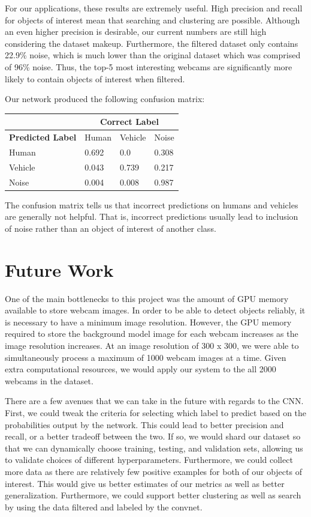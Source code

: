 \documentclass[10pt]{article} %
\begin{document}
For our applications, these results are extremely useful. High precision and
recall for objects of interest mean that searching and clustering are possible.
Although an even higher precision is desirable, our current numbers are still
high considering the dataset makeup. Furthermore, the filtered dataset only
contains 22.9\% noise, which is much lower than the original dataset which was
comprised of 96\% noise. Thus, the top-5 most interesting webcams are
significantly more likely to contain objects of interest when filtered.

Our network produced the following confusion matrix:
\begin{center}
  \begin{tabular}{ | m{8em} | m{5em}| m{5em} | m{5em} | }
    \hline
    & \multicolumn{3}{c|}{\textbf{Correct Label}} \\ 
    \hline
    \textbf{Predicted Label} & Human & Vehicle & Noise \\
    \hline
    Human & 0.692 & 0.0 & 0.308 \\
    \hline
    Vehicle & 0.043 & 0.739 & 0.217 \\
    \hline
    Noise & 0.004 & 0.008 & 0.987 \\
    \hline
  \end{tabular}
\end{center}
The confusion matrix tells us that incorrect predictions on humans and vehicles
are generally not helpful. That is, incorrect predictions usually lead to
inclusion of noise rather than an object of interest of another class.


\section{Future Work}
One of the main bottlenecks to this project was the amount of GPU memory available to store webcam images. In order to be able to detect objects reliably, it is necessary to have a minimum image resolution. However, the GPU memory required to store the background model image for each webcam increases as the image resolution increases. At an image resolution of 300 x 300, we were able to simultaneously process a maximum of 1000 webcam images at a time. Given extra computational resources, we would apply our system to the all 2000 webcams in the dataset.

There are a few avenues that we can take in the future with regards to the CNN. First,
we could tweak the criteria for selecting which label to predict based on the
probabilities output by the network. This could lead to better precision
and recall, or a better tradeoff between the two. If so, we would shard our dataset so that we can dynamically
choose training, testing, and validation sets, allowing us to
validate choices of different hyperparameters. Furthermore, we could
collect more data as there are relatively few positive examples for both of our
objects of interest. This would give us better estimates of our metrics as well
as better generalization. Furthermore, we could support better clustering as
well as search by using the data filtered and labeled by the convnet.
\end{document}
